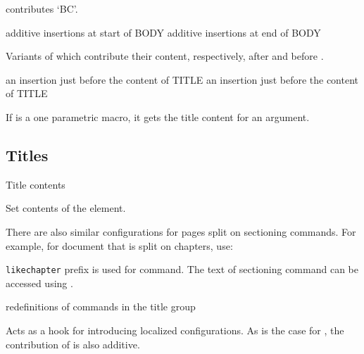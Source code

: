 \begin{texsource}
\end{texsource}

contributes `BC'.


 {additive insertions at start of BODY}\EndDoc
{} {additive insertions at end of BODY}\EndDoc

   Variants of  which contribute their content,
   respectively, after  and before .

 {an insertion just before the content of TITLE}\EndDoc
{} {an insertion just before the content of TITLE}\EndDoc

If  is a one parametric macro, it gets the title content for an
argument.



\subsection{Titles}

 {Title contents}\EndDoc

Set contents of the  element.

There are also similar configurations for pages split on sectioning commands. For example, for document that
is split on chapters, use:

\begin{texsource}
\end{texsource}

\texttt{likechapter} prefix is used for \texcommand{\chapter*} command. The text of sectioning command
can be accessed using .

 {redefinitions of commands in the title group}\EndDoc

Acts as a hook for introducing localized configurations. As is the case for
, the contribution of  is also
additive.


